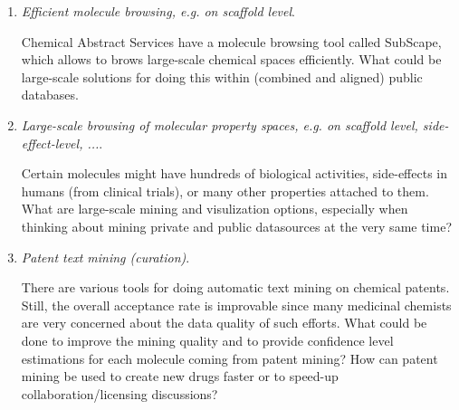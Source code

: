 \documentclass{sig-alternate}
\begin{document}
\begin{enumerate}

\item \emph{Efficient molecule browsing, e.g. on scaffold level}.

Chemical Abstract Services have a molecule browsing tool called SubScape, which allows to brows large-scale
chemical spaces efficiently. What could be large-scale solutions for doing this within (combined and aligned) 
public databases.
%
\item \emph{Large-scale browsing of molecular property spaces, e.g. on scaffold level, side-effect-level, ...}.

Certain molecules might have hundreds of biological activities, side-effects in humans (from clinical trials), or
many other properties attached to them. What are large-scale mining and visulization options, especially when thinking
about mining private and public datasources at the very same time?
%
\item \emph{Patent text mining (curation)}.

There are various tools for doing automatic text mining on chemical patents. Still, the overall acceptance rate is improvable
since many medicinal chemists are very concerned about the data quality of such efforts. What could be done to improve
the mining quality and to provide confidence level estimations for each molecule coming from patent mining? 
How can patent mining be used to create new drugs faster or to speed-up collaboration/licensing discussions?
\end{enumerate}
\end{document}
